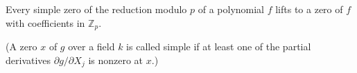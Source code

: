 Every simple zero of the reduction modulo $p$ of a polynomial $f$ lifts to a zero of $f$ with coefficients in $\mathbb{Z}_p$.

(A zero $x$ of $g$ over a field $k$ is called simple if at least one of the partial derivatives $\partial g / \partial X_j$ is nonzero at $x$.)
